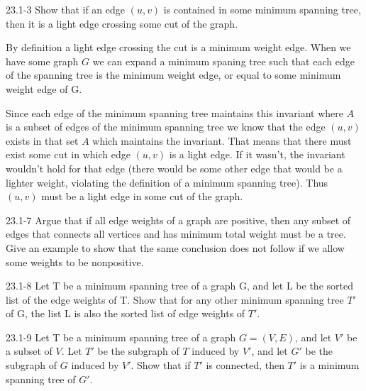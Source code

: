 




\homeworkheader{\classnameandsection}

\begin{problem}{23.1-3}
  Show that if an edge $(u,v)$ is contained in some minimum spanning tree, then it is a light edge crossing some cut of
  the graph.
  \begin{solution}
    By definition a light edge crossing the cut is a minimum weight edge. When we have some graph $G$ we can expand a
    minimum spaning tree such that each edge of the spanning tree is the minimum weight edge, or equal to some minimum
    weight edge of G.

    Since each edge of the minimum spanning tree maintains this invariant where $A$ is a subset of edges of the minimum
    spanning tree we know that the edge $(u,v)$ exists in that set $A$ which maintains the invariant. That means that
    there must exist some cut in which edge $(u,v)$ is a light edge. If it wasn't, the invariant wouldn't hold for that
    edge (there would be some other edge that would be a lighter weight, violating the definition of a minimum spanning
    tree).  Thus $(u,v)$ must be a light edge in some cut of the graph.
  \end{solution}
\end{problem}

\begin{problem}{23.1-7}
  Argue that if all edge weights of a graph are positive, then any subset of edges that connects all vertices and has
  minimum total weight must be a tree. Give an example to show that the same conclusion does not follow if we allow some
  weights to be nonpositive.
\end{problem}

\begin{problem}{23.1-8}
  Let T be a minimum spanning tree of a graph G, and let L be the sorted list of the edge weights of T. Show that for
  any other minimum spanning tree $T'$ of G, the list L is also the sorted list of edge weights of $T'$.
\end{problem}

\begin{problem}{23.1-9}
  Let T be a minimum spanning tree of a graph $G = (V,E)$, and let $V'$ be a subset of $V$. Let $T'$ be the subgraph of
  $T$ induced by $V'$, and let $G'$ be the subgraph of $G$ induced by $V'$. Show that if $T'$ is connected, then $T'$ is
  a minimum spanning tree of $G'$.
\end{problem}

